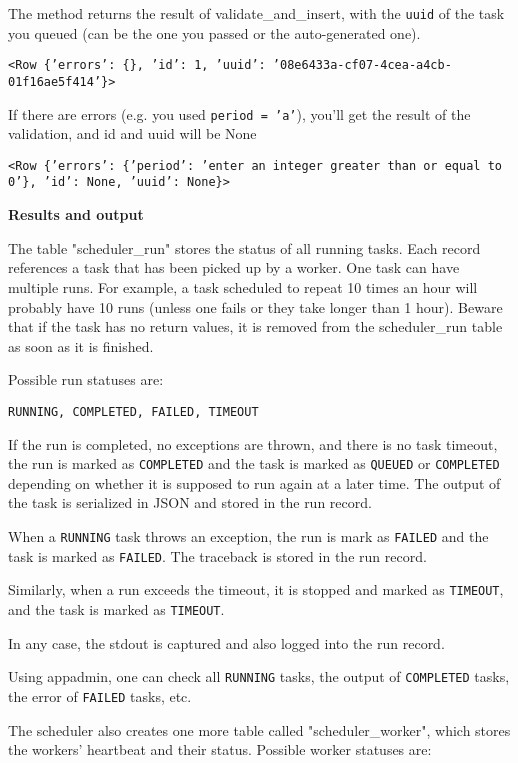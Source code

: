 \documentclass[justified,sixbynine,notoc]{tufte-book}
\def\ft{\small\tt}
\begin{document}
\begin{fullwidth}
The method returns the result of validate\_and\_insert, with the {\ft uuid} of the task you queued (can be the one you passed or the auto-generated one).

{\ft <Row \{'errors': \{\}, 'id': 1, 'uuid': '08e6433a-cf07-4cea-a4cb-01f16ae5f414'\}>}

If there are errors (e.g. you used {\ft period = 'a'}), you'll get the result of the validation, and id and uuid will be None

{\ft <Row \{'errors': \{'period': 'enter an integer greater than or equal to 0'\}, 'id': None, 'uuid': None\}>}

{\bf Results and output}

The table "scheduler\_run" stores the status of all running tasks. Each record references a task that has been picked up by a worker.  One task can have multiple runs. For example, a task scheduled to repeat 10 times an hour will probably have 10 runs (unless one fails or they take longer than 1 hour). Beware that if the task has no return values, it is removed from the scheduler\_run table as soon as it is finished.

Possible run statuses are:

\begin{lstlisting}
RUNNING, COMPLETED, FAILED, TIMEOUT
\end{lstlisting}

If the run is completed, no exceptions are thrown, and there is no task timeout, the run is marked as {\ft COMPLETED} and the task is marked as {\ft QUEUED} or {\ft COMPLETED} depending on whether it is supposed to run again at a later time. The output of the task is serialized in JSON and stored in the run record.

When a {\ft RUNNING} task throws an exception, the run is mark as {\ft FAILED} and the task is marked as {\ft FAILED}. The traceback is stored in the run record.

Similarly, when a run exceeds the timeout, it is stopped and marked as {\ft TIMEOUT}, and the task is marked as {\ft TIMEOUT}.

In any case, the stdout is captured and also logged into the run record.

Using appadmin, one can check all {\ft RUNNING} tasks, the output of {\ft COMPLETED} tasks, the error of {\ft FAILED} tasks, etc.

The scheduler also creates one more table called "scheduler\_worker", which stores the workers' heartbeat and their status. Possible worker statuses are:


\end{fullwidth}
\end{document}
